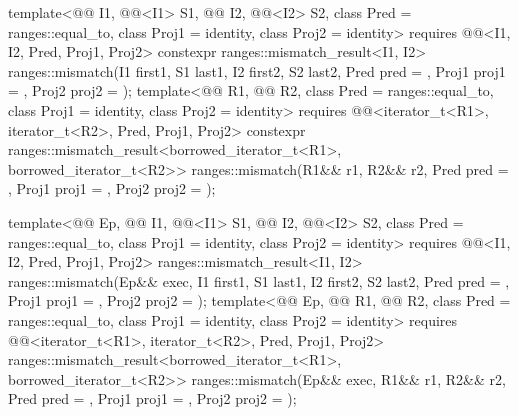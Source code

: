\begin{itemdecl}
template<@@ I1, @@<I1> S1, @@ I2, @@<I2> S2,
         class Pred = ranges::equal_to, class Proj1 = identity, class Proj2 = identity>
  requires @@<I1, I2, Pred, Proj1, Proj2>
  constexpr ranges::mismatch_result<I1, I2>
    ranges::mismatch(I1 first1, S1 last1, I2 first2, S2 last2, Pred pred = {},
                     Proj1 proj1 = {}, Proj2 proj2 = {});
template<@@ R1, @@ R2,
         class Pred = ranges::equal_to, class Proj1 = identity, class Proj2 = identity>
  requires @@<iterator_t<R1>, iterator_t<R2>, Pred, Proj1, Proj2>
  constexpr ranges::mismatch_result<borrowed_iterator_t<R1>, borrowed_iterator_t<R2>>
    ranges::mismatch(R1&& r1, R2&& r2, Pred pred = {},
                     Proj1 proj1 = {}, Proj2 proj2 = {});

template<@@ Ep, @@ I1, @@<I1> S1,
         @@ I2, @@<I2> S2,
         class Pred = ranges::equal_to, class Proj1 = identity, class Proj2 = identity>
  requires @@<I1, I2, Pred, Proj1, Proj2>
  ranges::mismatch_result<I1, I2>
    ranges::mismatch(Ep&& exec, I1 first1, S1 last1, I2 first2, S2 last2, Pred pred = {},
                     Proj1 proj1 = {}, Proj2 proj2 = {});
template<@@ Ep, @@ R1, @@ R2,
         class Pred = ranges::equal_to, class Proj1 = identity, class Proj2 = identity>
  requires @@<iterator_t<R1>, iterator_t<R2>, Pred, Proj1, Proj2>
  ranges::mismatch_result<borrowed_iterator_t<R1>, borrowed_iterator_t<R2>>
    ranges::mismatch(Ep&& exec, R1&& r1, R2&& r2, Pred pred = {},
                     Proj1 proj1 = {}, Proj2 proj2 = {});
\end{itemdecl}


